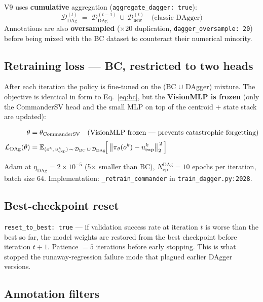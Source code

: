 \documentclass[11pt, a4paper]{article}
\newcommand{\E}{\mathbb{E}}
\newcommand{\D}{\mathcal{D}}
\newcommand{\cL}{\mathcal{L}}
\begin{document}
V9 uses \textbf{cumulative} aggregation
(\texttt{aggregate\_dagger: true}):
\begin{equation}
\D_{\text{DAg}}^{(t)} \;=\; \D_{\text{DAg}}^{(t-1)} \,\cup\, \D_{\text{new}}^{(t)}
\quad\text{(classic DAgger)}
\end{equation}
Annotations are also \textbf{oversampled} ($\times 20$ duplication,
\texttt{dagger\_oversample: 20}) before being mixed with the BC dataset to
counteract their numerical minority.

\subsection{Retraining loss --- BC, restricted to two heads}

After each iteration the policy is fine-tuned on the (BC $\cup$ DAgger)
mixture. The objective is identical in form to Eq.~\eqref{eq:bc}, but the
\textbf{VisionMLP is frozen} (only the CommanderSV head and the small MLP
on top of the centroid + state stack are updated):

\begin{formulabox}
\begin{align}
\theta &= \theta_{\text{CommanderSV}}
       \quad\text{(VisionMLP frozen --- prevents catastrophic forgetting)}\\[2pt]
\cL_{\text{DAg}}(\theta)
   &= \E_{(o^k,\,u^k_{\text{exp}})\,\sim\,\D_{\text{BC}}\,\cup\,\D_{\text{DAg}}}
      \!\Bigl[\,\bigl\|\pi_\theta(o^k) - u^k_{\text{exp}}\bigr\|_2^{\,2}\,\Bigr]
\end{align}
\end{formulabox}

\noindent
Adam at $\eta_{\text{DAg}} = 2{\times}10^{-5}$ (5$\times$ smaller than BC),
$N_{\text{ep}}^{\text{DAg}} = 10$ epochs per iteration, batch size $64$.
Implementation: \texttt{\_retrain\_commander} in \texttt{train\_dagger.py:2028}.

\subsection{Best-checkpoint reset}

\texttt{reset\_to\_best: true} --- if validation success rate at iteration
$t$ is worse than the best so far, the model weights are restored from the
best checkpoint before iteration $t+1$. Patience $= 5$ iterations before
early stopping. This is what stopped the runaway-regression failure mode
that plagued earlier DAgger versions.

\subsection{Annotation filters}
\end{document}
